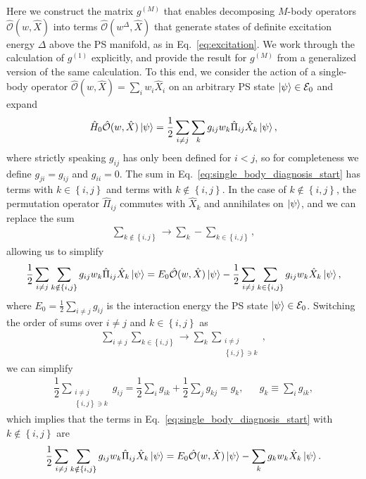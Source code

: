 \documentclass[aps,pra,nofootinbib,twocolumn,superscriptaddress]{revtex4-2}
\newcommand{\f}[2]{\dfrac{#1}{#2}} %
\renewcommand{\set}[1]{\left\{#1\right\}} %
\newcommand{\1}{\mathds{1}}
\renewcommand{\H}{\hat H}
\renewcommand{\O}{\hat{\mathcal{O}}}
\newcommand{\E}{\mathcal{E}}
\begin{document}
Here we construct the matrix $g^{(M)}$ that enables decomposing $M$-body operators $\O(w,\hat X)$ into terms $\O(w^\Delta,\hat X)$ that generate states of definite excitation energy $\Delta$ above the PS manifold, as in Eq.~\eqref{eq:excitation}.
We work through the calculation of $g^{(1)}$ explicitly, and provide the result for $g^{(M)}$ from a generalized version of the same calculation.
To this end, we consider the action of a single-body operator $\O(w,\hat X)=\sum_iw_i\hat X_i$ on an arbitrary PS state $\ket\psi\in\E_0$ and expand
\begin{align}
  \H_0 \O(w,\hat X) \ket\psi
  = \f12 \sum_{i\ne j} \sum_k g_{ij} w_k \hat\Pi_{ij} \hat X_k \ket\psi,
  \label{eq:single_body_diagnosis_start}
\end{align}
where strictly speaking $g_{ij}$ has only been defined for $i<j$, so for completeness we define $g_{ji}=g_{ij}$ and $g_{ii}=0$.
The sum in Eq.~\eqref{eq:single_body_diagnosis_start} has terms with $k\in\set{i,j}$ and terms with $k\notin\set{i,j}$.
In the case of $k\notin\set{i,j}$, the permutation operator $\hat\Pi_{ij}$ commutes with $\hat X_k$ and annihilates on $\ket\psi$, and we can replace the sum
\begin{align}
  \sum_{k\notin\set{i,j}} \to \sum_k - \sum_{k\in\set{i,j}},
\end{align}
allowing us to simplify
\begin{align}
  \f12 \sum_{i\ne j} \sum_{k\notin\set{i,j}}
  g_{ij} w_k \hat\Pi_{ij} \hat X_k \ket\psi
  = E_0 \O(w,\hat X) \ket\psi
  - \f12 \sum_{i\ne j} \sum_{k\in\set{i,j}} g_{ij} w_k \hat X_k \ket\psi,
\end{align}
where $E_0=\frac12\sum_{i\ne j}g_{ij}$ is the interaction energy the PS state $\ket\psi\in\E_0$.
Switching the order of sums over $i\ne j$ and $k\in\set{i,j}$ as
\begin{align}
  \sum_{i\ne j} \sum_{k\in\set{i,j}}
  \to \sum_k \sum_{\substack{i\ne j\\\set{i,j}\ni k}},
\end{align}
we can simplify
\begin{align}
  \f12 \sum_{\substack{i\ne j\\\set{i,j}\ni k}} g_{ij}
  = \f12 \sum_i g_{ik} + \f12 \sum_j g_{kj}
  = g_k,
  &&
  g_k \equiv \sum_i g_{ik},
\end{align}
which implies that the terms in Eq.~\eqref{eq:single_body_diagnosis_start}
with $k\notin\set{i,j}$ are
\begin{align}
  \f12 \sum_{i\ne j} \sum_{k\notin\set{i,j}}
  g_{ij} w_k \hat\Pi_{ij} \hat X_k \ket\psi
  = E_0 \O(w,\hat X) \ket\psi - \sum_k g_k w_k \hat X_k \ket\psi.
\end{align}
\end{document}
